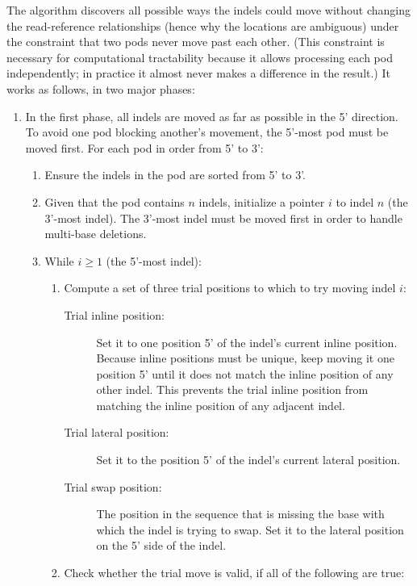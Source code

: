 \documentclass{article}
\begin{document}
The algorithm discovers all possible ways the indels could move without changing the read-reference relationships (hence why the locations are ambiguous) under the constraint that two pods never move past each other.
(This constraint is necessary for computational tractability because it allows processing each pod independently; in practice it almost never makes a difference in the result.)
It works as follows, in two major phases:
\begin{enumerate}
    \item In the first phase, all indels are moved as far as possible in the 5' direction.
    To avoid one pod blocking another's movement, the 5'-most pod must be moved first.
    For each pod in order from 5' to 3':
    \begin{enumerate}
        \item Ensure the indels in the pod are sorted from 5' to 3'.
        \item Given that the pod contains $n$ indels, initialize a pointer $i$ to indel $n$ (the 3'-most indel).
        The 3'-most indel must be moved first in order to handle multi-base deletions.
        \item While $i \ge 1$ (the 5'-most indel):
        \begin{enumerate}
            \item Compute a set of three trial positions to which to try moving indel $i$:
            \begin{description}
                \item[Trial inline position:] Set it to one position 5' of the indel's current inline position.
                Because inline positions must be unique, keep moving it one position 5' until it does not match the inline position of any other indel.
                This prevents the trial inline position from matching the inline position of any adjacent indel.
                \item[Trial lateral position:] Set it to the position 5' of the indel's current lateral position.
                \item[Trial swap position:] The position in the sequence that is missing the base with which the indel is trying to swap.
                Set it to the lateral position on the 5' side of the indel.
            \end{description}
            \item Check whether the trial move is valid, if all of the following are true:
            \begin{itemize}

\end{itemize}
\end{enumerate}
\end{enumerate}
\end{enumerate}
\end{document}
